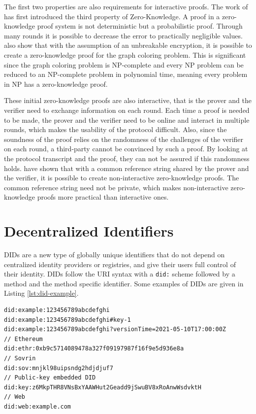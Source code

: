 The first two properties are also requirements for interactive proofs. The work of \cite{Goldwasser.1985} has first introduced the third property of Zero-Knowledge. A proof in a zero-knowledge proof system is not deterministic but a probabilistic proof. Through many rounds it is possible to decrease the error to practically negligible values. \cite{Goldreich.1991} also show that with the assumption of an unbreakable encryption, it is possible to create a zero-knowledge proof for the graph coloring problem. This is significant since the graph coloring problem is NP-complete and every NP problem can be reduced to an NP-complete problem in polynomial time, meaning every problem in NP has a zero-knowledge proof. 

These initial zero-knowledge proofs are also interactive, that is the prover and the verifier need to exchange information on each round. Each time a proof is needed to be made, the prover and the verifier need to be online and interact in multiple rounds, which makes the usability of the protocol difficult. Also, since the soundness of the proof relies on the randomness of the challenges of the verifier on each round, a third-party cannot be convinced by such a proof. By looking at the protocol transcript and the proof, they can not be assured if this randomness holds. \cite{Blum.1988} have shown that with a common reference string shared by the prover and the verifier, it is possible to create non-interactive zero-knowledge proofs. The common reference string need not be private, which makes non-interactive zero-knowledge proofs more practical than interactive ones.


\section{Decentralized Identifiers}

\acrfull{DID}s \parencite{reed_sporny_longley_allen_grant_sabadello_2021} are a new type of globally unique identifiers that do not depend on centralized identity providers or registries, and give their users full control of their identity. \acrshort{DID}s follow the \acrshort{URI} syntax with a \lstinline{did:} scheme followed by a method and the method specific identifier. Some examples of \acrshort{DID}s are given in Listing \ref{lst:did-example}.

\begin{lstlisting}[label={lst:did-example}, caption={\acrlong{DID} examples}]
did:example:123456789abcdefghi
did:example:123456789abcdefghi#key-1
did:example:123456789abcdefghi?versionTime=2021-05-10T17:00:00Z
// Ethereum 
did:ethr:0xb9c5714089478a327f09197987f16f9e5d936e8a
// Sovrin
did:sov:mnjkl98uipsndg2hdjdjuf7
// Public-key embedded DID
did:key:z6MkpTHR8VNsBxYAAWHut2Geadd9jSwuBV8xRoAnwWsdvktH
// Web
did:web:example.com
\end{lstlisting}

